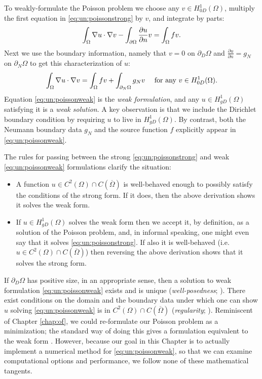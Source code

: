 To weakly-formulate the Poisson problem we choose any $v\in H_{0D}^1(\Omega)$, multiply the first equation in \eqref{eq:un:poissonstrong} by $v$, and integrate by parts:
\begin{equation*}
\int_\Omega \nabla u \cdot \nabla v - \int_{\partial\Omega} \frac{\partial u}{\partial n} v = \int_\Omega f v.
\end{equation*}
Next we use the boundary information, namely that $v=0$ on $\partial_D\Omega$ and $\frac{\partial u}{\partial n}=g_N$ on $\partial_N\Omega$ to get this characterization of $u$:
\begin{equation}
\int_\Omega \nabla u \cdot \nabla v = \int_\Omega f v + \int_{\partial_N\Omega} g_N v\quad \text{ for any } v\in H_{0D}^1(\Omega). \label{eq:un:poissonweak}
\end{equation}
Equation \eqref{eq:un:poissonweak} is the \emph{weak formulation}, and any $u \in H_{gD}^1(\Omega)$ satisfying it is a \emph{weak solution}.  A key observation is that we include the Dirichlet boundary condition by requiring $u$ to live in $H_{gD}^1(\Omega)$.  By contrast, both the Neumann boundary data $g_N$ and the source function $f$ explicitly appear in \eqref{eq:un:poissonweak}.

The rules for passing between the strong \eqref{eq:un:poissonstrong} and weak \eqref{eq:un:poissonweak} formulations clarify the situation:\begin{itemize}
\item A function $u \in C^2(\Omega) \cap C(\overline \Omega)$ is well-behaved enough to possibly satisfy the conditions of the strong form.  If it does, then the above derivation shows it solves the weak form.
\item If $u \in H_{gD}^1(\Omega)$ solves the weak form then we accept it, by definition, as a solution of the Poisson problem, and, in informal speaking, one might even say that it solves \eqref{eq:un:poissonstrong}.  If also it is well-behaved (i.e.~$u \in C^2(\Omega) \cap C(\overline \Omega)$) then reversing the above derivation shows that it solves the strong form.
\end{itemize}

If $\partial_D \Omega$ has positive size, in an appropriate sense, then a solution to weak formulation \eqref{eq:un:poissonweak} exists and is unique (\emph{well-posedness}; \citep{Ciarlet2002,Evans2010}).  There exist conditions on the domain and the boundary data under which one can show $u$ solving \eqref{eq:un:poissonweak} is in $C^2(\Omega) \cap C(\overline \Omega)$ (\emph{regularity}; \citep{Evans2010}).  Reminiscent of Chapter \ref{chap:of}, we could re-formulate our Poisson problem as a minimization; the standard way of doing this gives a formulation equivalent to the weak form \citep{Evans2010}.  However, because our goal in this Chapter is to actually implement a numerical method for \eqref{eq:un:poissonweak}, so that we can examine computational options and performance, we follow none of these mathematical tangents.


